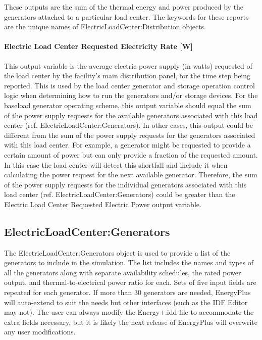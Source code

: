 These outputs are the sum of the thermal energy and power produced by the generators attached to a particular load center. The keywords for these reports are the unique names of ElectricLoadCenter:Distribution objects.

\paragraph{Electric Load Center Requested Electricity Rate {[}W{]}}\label{electric-load-center-requested-electric-power-w}

This output variable is the average electric power supply (in watts) requested of the load center by the facility's main distribution panel, for the time step being reported. This is used by the load center generator and storage operation control logic when determining how to run the generators and/or storage devices. For the baseload generator operating scheme, this output variable should equal the sum of the power supply requests for the available generators associated with this load center (ref. ElectricLoadCenter:Generators). In other cases, this output could be different from the sum of the power supply requests for the generators associated with this load center. For example, a generator might be requested to provide a certain amount of power but can only provide a fraction of the requested amount. In this case the load center will detect this shortfall and include it when calculating the power request for the next available generator. Therefore, the sum of the power supply requests for the individual generators associated with this load center (ref. ElectricLoadCenter:Generators) could be greater than the Electric Load Center Requested Electric Power output variable.

\subsection{ElectricLoadCenter:Generators}\label{electricloadcentergenerators}

The ElectricLoadCenter:Generators object is used to provide a list of the generators to include in the simulation. The list includes the names and types of all the generators along with separate availability schedules, the rated power output, and thermal-to-electrical power ratio for each. Sets of five input fields are repeated for each generator. If more than 30 generators are needed, EnergyPlus will auto-extend to suit the needs but other interfaces (such as the IDF Editor may not). The user can always modify the Energy+.idd file to accommodate the extra fields necessary, but it is likely the next release of EnergyPlus will overwrite any user modifications.

